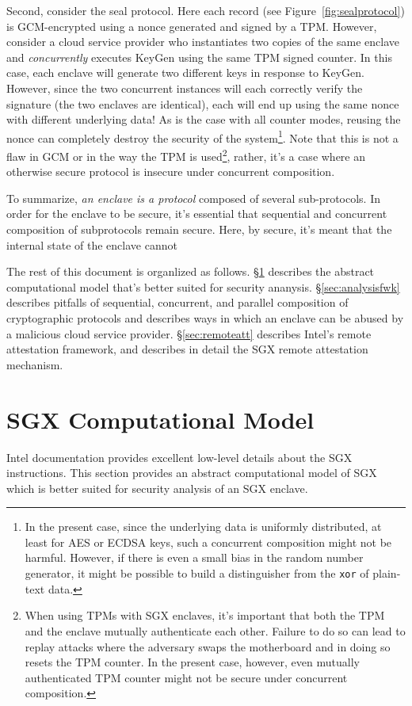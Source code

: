 \documentclass[10pt]{article}
\newcommand{\secref}[1]{\S\ref{#1}}
\begin{document}
  Second, consider the seal protocol. Here each record (see
  Figure~\ref{fig:sealprotocol}) is GCM-encrypted using a nonce
  generated and signed by a TPM. However, consider a cloud service
  provider who instantiates two copies of the same enclave and
  \textit{concurrently} executes \textsf{KeyGen} using the same TPM
  signed counter. In this case, each enclave will generate two
  different keys in response to \textsf{KeyGen}. However, since the
  two concurrent instances will each correctly verify the signature
  (the two enclaves are identical), each will end up using the same
  nonce with different underlying data! As is the case with all
  counter modes, reusing the nonce can completely destroy the security
  of the system\footnote{In the present case, since the underlying
    data is uniformly distributed, at least for AES or ECDSA keys,
    such a concurrent composition might not be harmful. However, if
    there is even a small bias in the random number generator, it
    might be possible to build a distinguisher from the \texttt{xor}
    of plain-text data.}. Note that this is not a flaw in GCM or in
  the way the TPM is used\footnote{When using TPMs with SGX enclaves,
    it's important that both the TPM and the enclave mutually
    authenticate each other. Failure to do so can lead to replay
    attacks where the adversary swaps the motherboard and in doing so
    resets the TPM counter. In the present case, however, even
    mutually authenticated TPM counter might not be secure under
    concurrent composition.}, rather, it's a case where an otherwise
  secure protocol is insecure under concurrent composition.

  To summarize, \textit{an enclave is a protocol} composed of several
  sub-protocols. In order for the enclave to be secure, it's essential
  that sequential and concurrent composition of subprotocols remain
  secure. Here, by secure, it's meant that the internal state of the
  enclave cannot

  The rest of this document is organlized as follows.
  \secref{sec:model} describes the abstract computational model that's
  better suited for security ananysis. \secref{sec:analysisfwk}
  describes pitfalls of sequential, concurrent, and parallel
  composition of cryptographic protocols and describes ways in which
  an enclave can be abused by a malicious cloud service
  provider. \secref{sec:remoteatt} describes Intel's remote attestation
  framework, and describes in detail the SGX remote attestation
  mechanism.

  \section{SGX Computational Model}
  \label{sec:model}
  Intel documentation\cite{intelsdm} provides excellent low-level
  details about the SGX instructions. This section provides an
  abstract computational model of SGX which is better suited for
  security analysis of an SGX enclave.
\end{document}
